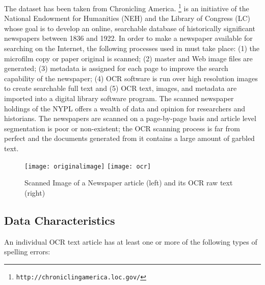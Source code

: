 The dataset has been taken from Chronicling America.
\footnote{\texttt{http://chroniclingamerica.loc.gov/}} is an
initiative of the National Endowment for Humanities (NEH) and the
Library of Congress (LC) whose goal is to develop an online,
searchable database of historically significant newspapers between
1836 and 1922. 
In order to make a newspaper available for searching on the Internet,
the following processes used in \cite{dutta2011learning} must take place: (1) the microfilm copy or
paper original is scanned; (2) master and Web image files are
generated; (3) metadata is assigned for each page to improve the
search capability of the newspaper; (4) OCR software is run over high
resolution images to create searchable full text and (5) OCR text,
images, and metadata are imported into a digital library software
program. The scanned newspaper holdings of the NYPL offers a wealth of
data and opinion for researchers and historians.
The newspapers are scanned on a page-by-page basis and article level
segmentation is poor or non-existent; the OCR scanning process is far
from perfect and the documents generated from it contains a large
amount of garbled text.

\begin{figure*}
\texttt{[image: originalimage]}
\texttt{[image: ocr]}
\caption{Scanned Image of a Newspaper article (left) and its OCR raw text (right)}
\label{figure:1}
\end{figure*}

\subsection{Data Characteristics}
An individual OCR text article has at least one or more of the following types of spelling errors:



